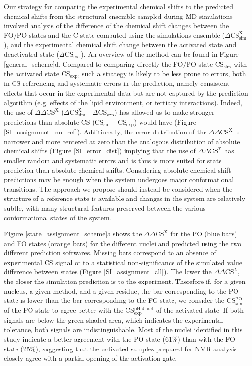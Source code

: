 \documentclass[%
 aip,
 amsmath,amssymb,
 preprint,%
]{revtex4-1}
\begin{document}
Our strategy for comparing the experimental chemical shifts to the predicted chemical shifts from the structural ensemble sampled during MD simulations involved analysis of the difference of the chemical shift changes between the FO/PO states and the C state computed using the simulations ensemble ($\Delta\text{CS}_{\text{sim}}^{\text{X}}$), and the experimental chemical shift change between the activated state and deactivated state ($\Delta\text{CS}_{\text{exp}}$). An overview of the method can be found in Figure \ref{general_scheme}d. Compared to comparing directly the FO/PO state CS$_\text{sim}$ with the activated state CS$_\text{exp}$, such a strategy is likely to be less prone to errors, both in CS referencing and systematic errors in the prediction, namely consistent effects that occur in the experimental data but are not captured by the prediction algorithm (e.g. effects of the lipid environment, or tertiary interactions). Indeed, the use of $\Delta\Delta\text{CS}^{\text{X}}$ ($\Delta\text{CS}_{\text{sim}}^{\text{X}}$ - $\Delta\text{CS}_{\text{exp}}$) has allowed us to make stronger predictions than absolute CS (CS$_{\text{sim}}$ - $\text{CS}_{\text{exp}}$) would have (Figure \ref{SI_assignment_no_ref}). Additionally, the error distribution of the $\Delta\Delta\text{CS}^{\text{X}}$ is narrower and more centered at zero than the analogous distribution of absolute chemical shifts (Figure \ref{SI_error_dist}) implying that the use of $\Delta\Delta\text{CS}^{\text{X}}$ has smaller random and systematic errors and is thus is more suited for state prediction than absolute chemical shifts. Considering absolute chemical shift predictions may be enough when the system undergoes major conformational transitions. The approach we propose should instead be considered when the structure of a reference state is available and changes in the system are relatively subtle, with many structural features preserved between the various conformational states of the system. 

Figure \ref{state_assignment_scheme}a shows the $\Delta\Delta\text{CS}^{\text{X}}$ for the PO (blue bars) and FO states (orange bars) for the different nuclei and predicted using the two different prediction softwares. Missing bars correspond to an absence of experimental CS signal or to a statistical non-significance of the simulated value difference between states (Figure \ref{SI_assignment_all}). The lower the $\Delta\Delta\text{CS}^{\text{X}}$, the closer the simulation prediction is to the experiment. Therefore if, for a given nucleus, a given method, and a given residue, the bar corresponding to the PO state is lower than the bar corresponding to the FO state, we consider the CS$^\text{PO}_{\text{sim}}$ of the PO state to agree better with the CS$^\text{pH 4, act}_{\text{exp}}$ of the activated state. If both signals are below the green shaded area, which indicates the experimental tolerance, both signals are indistinguishable. Most of the nuclei identified in this study indicate a better agreement with the PO state (61$\%$) than with the FO state (25$\%$), suggesting that the activated samples prepared for NMR analysis closely agree with a partial opening of the activation gate. 
\end{document}
